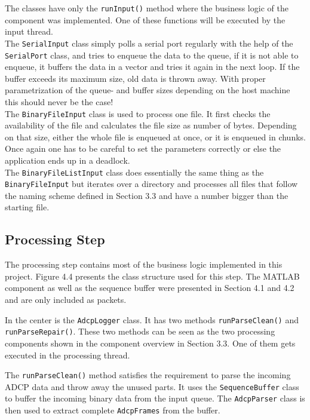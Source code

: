 The classes have only the \texttt{runInput()} method where the business logic of the component was implemented. One of these functions will be executed by the input thread. \\ 
The \texttt{SerialInput} class simply polls a serial port regularly with the help of the \texttt{SerialPort} class, and tries to enqueue the data to the queue, if it is not able to enqueue, it buffers the data in a vector and tries it again in the next loop. If the buffer exceeds its maximum size, old data is thrown away. With proper parametrization of the queue- and buffer sizes depending on the host machine this should never be the case!\\
The \texttt{BinaryFileInput} class is used to process one file. It first checks the availability of the file and calculates the file size as number of bytes. Depending on that size, either the whole file is enqueued at once, or it is enqueued in chunks. Once again one has to be careful to set the parameters correctly or else the application ends up  in a deadlock.\\
The \texttt{BinaryFileListInput} class does essentially the same thing as the \texttt{BinaryFileInput} but iterates over a directory and processes all files that follow the naming scheme defined in Section 3.3 and have a number bigger than the starting file.
\subsection{Processing Step}
The processing step contains most of the business logic implemented in this project. Figure 4.4 presents the class structure used for this step. The MATLAB component as well as the sequence buffer were presented in Section 4.1 and 4.2 and are only included as packets.

In the center is the \texttt{AdcpLogger} class. It has two methods \texttt{runParseClean()} and \texttt{runParseRepair()}. These two methods can be seen as the two processing components shown in the component overview in Section 3.3. One of them gets executed in the processing thread.

The \texttt{runParseClean()} method satisfies the requirement to parse the incoming ADCP data and throw away the unused parts. It uses the \texttt{SequenceBuffer} class to buffer the incoming binary data from the input queue. The \texttt{AdcpParser} class is then used to extract complete \texttt{AdcpFrames} from the buffer.

